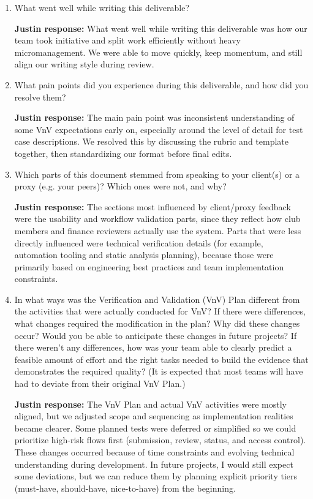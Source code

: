 \documentclass[12pt, titlepage]{article}
\begin{document}
\begin{enumerate}
  \item What went well while writing this deliverable?

  \noindent\textbf{Justin response:} What went well while writing this
  deliverable was how our team took initiative and split work efficiently
  without heavy micromanagement. We were able to move quickly, keep momentum,
  and still align our writing style during review.

  \item What pain points did you experience during this deliverable, and how
    did you resolve them?

  \noindent\textbf{Justin response:} The main pain point was inconsistent
  understanding of some VnV expectations early on, especially around the level
  of detail for test case descriptions. We resolved this by discussing the
  rubric and template together, then standardizing our format before final
  edits.

  \item Which parts of this document stemmed from speaking to your client(s) or
  a proxy (e.g. your peers)? Which ones were not, and why?

  \noindent\textbf{Justin response:} The sections most influenced by
  client/proxy feedback were the usability and workflow validation parts, since
  they reflect how club members and finance reviewers actually use the system.
  Parts that were less directly influenced were technical verification details
  (for example, automation tooling and static analysis planning), because those
  were primarily based on engineering best practices and team implementation
  constraints.

  \item In what ways was the Verification and Validation (VnV) Plan different
  from the activities that were actually conducted for VnV?  If there were
  differences, what changes required the modification in the plan?  Why did
  these changes occur?  Would you be able to anticipate these changes in future
  projects?  If there weren't any differences, how was your team able to clearly
  predict a feasible amount of effort and the right tasks needed to build the
  evidence that demonstrates the required quality?  (It is expected that most
  teams will have had to deviate from their original VnV Plan.)

  \noindent\textbf{Justin response:} The VnV Plan and actual VnV activities
  were mostly aligned, but we adjusted scope and sequencing as implementation
  realities became clearer. Some planned tests were deferred or simplified so we
  could prioritize high-risk flows first (submission, review, status, and access
  control). These changes occurred because of time constraints and evolving
  technical understanding during development. In future projects, I would still
  expect some deviations, but we can reduce them by planning explicit priority
  tiers (must-have, should-have, nice-to-have) from the beginning.
\end{enumerate}
\end{document}

